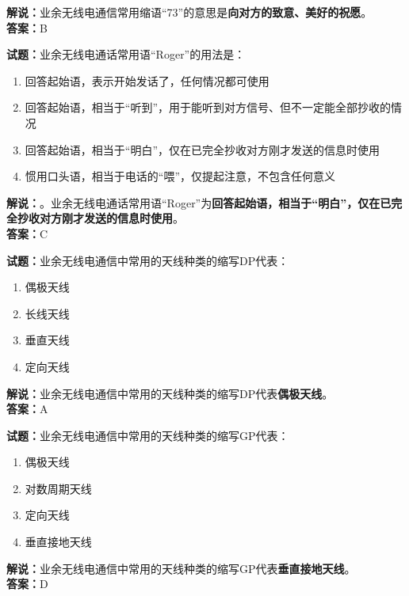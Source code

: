 \documentclass{ctexbook}
\begin{document}
\noindent\textbf{解说：}业余无线电通信常用缩语“73”的意思是\textbf{向对方的致意、美好的祝愿}。\\\noindent\textbf{答案：}B


\bigskip


\noindent\textbf{试题：}业余无线电通话常用语“Roger”的用法是：

\begin{enumerate}[leftmargin=3em]
	\item 回答起始语，表示开始发话了，任何情况都可使用
	\item 回答起始语，相当于“听到”，用于能听到对方信号、但不一定能全部抄收的情况
	\item 回答起始语，相当于“明白”，仅在已完全抄收对方刚才发送的信息时使用
	\item 惯用口头语，相当于电话的“喂”，仅提起注意，不包含任何意义
\end{enumerate}

\noindent\textbf{解说：}。业余无线电通话常用语“Roger”为\textbf{回答起始语，相当于“明白”，仅在已完全抄收对方刚才发送的信息时使用}。\\\noindent\textbf{答案：}C


\bigskip


\noindent\textbf{试题：}业余无线电通信中常用的天线种类的缩写DP代表：

\begin{enumerate}[leftmargin=3em]
	\item 偶极天线
	\item 长线天线
	\item 垂直天线
	\item 定向天线
\end{enumerate}

\noindent\textbf{解说：}业余无线电通信中常用的天线种类的缩写DP代表\textbf{偶极天线}。\\\noindent\textbf{答案：}A


\bigskip


\noindent\textbf{试题：}业余无线电通信中常用的天线种类的缩写GP代表：

\begin{enumerate}[leftmargin=3em]
	\item 偶极天线
	\item 对数周期天线
	\item 定向天线
	\item 垂直接地天线
\end{enumerate}

\noindent\textbf{解说：}业余无线电通信中常用的天线种类的缩写GP代表\textbf{垂直接地天线}。\\\noindent\textbf{答案：}D
\end{document}

